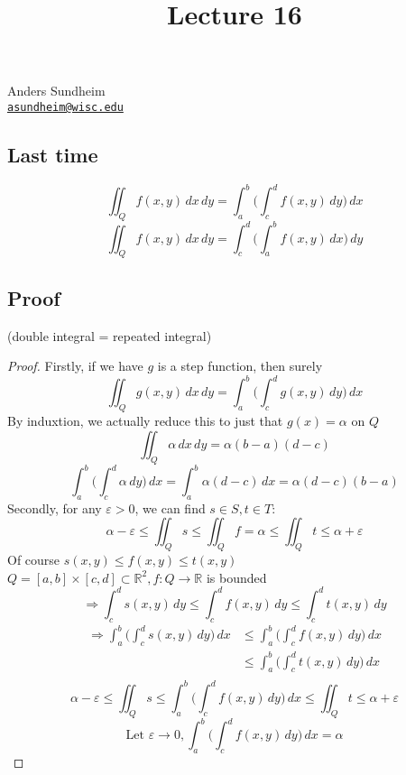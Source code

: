 \documentclass[12pt]{article}
\title{Lecture 16}
\newcommand{\BR}{\mathbb R}
\begin{document}
\maketitle
\vspace*{-0.25in}
\begin{center}
	Anders Sundheim \\
	\href{mailto:asundheim@wisc.edu}{{\tt asundheim@wisc.edu}}
\end{center}
\subsection*{Last time}
  \[ \iint_Qf(x,y)\,dx\,dy=\int_a^b\Big(\int_c^df(x,y)\,dy\Big)\,dx \]
  \[ \iint_Qf(x,y)\,dx\,dy=\int_c^d\Big(\int_a^bf(x,y)\,dx\Big)\,dy \]
\subsection*{Proof}
  (double integral = repeated integral) \\
  \begin{proof}
    Firstly, if we have $g$ is a step function, then surely
    \[ \iint_Qg(x,y)\,dx\,dy=\int_a^b\Big(\int_c^dg(x,y)\,dy\Big)\,dx \]
    By induxtion, we actually reduce this to just that $g(x)=\alpha$ on $Q$ \\
    \[ \iint_Q\alpha\,dx\,dy = \alpha(b-a)(d-c) \]
    \[ \int_a^b\Big(\int_c^d\alpha\,dy\Big)\,dx=\int_a^b\alpha(d-c)\,dx=\alpha(d-c)(b-a) \]
    Secondly, for any $\varepsilon>0$, we can find $s\in S,t\in T:$ \\
    \[ \alpha-\varepsilon\leq\iint_Qs\leq\iint_Qf=\alpha\leq\iint_Qt\leq\alpha+\varepsilon \]
    Of course $s(x,y)\leq f(x,y)\leq t(x,y)$ \\
    $Q=[a,b]\times[c,d]\subset\BR^2,f:Q\rightarrow\BR$ is bounded \\
    \[ \Rightarrow \int_c^ds(x,y)\,dy\leq\int_c^df(x,y)\,dy\leq\int_c^dt(x,y)\,dy \]
    \begin{align*}
      \Rightarrow \int_a^b\Big(\int_c^ds(x,y)\,dy\Big)\,dx & \leq\int_a^b\Big(\int_c^df(x,y)\,dy\Big)\,dx \\
      & \leq \int_a^b\Big(\int_c^dt(x,y)\,dy\Big)\,dx \\
    \end{align*}
    \[ \alpha-\varepsilon\leq\iint_Qs\leq\int_a^b\Big(\int_c^df(x,y)\,dy\Big)\,dx\leq\iint_Qt\leq\alpha+\varepsilon \]
    \[ \text{Let }\varepsilon\rightarrow 0,\int_a^b\Big(\int_c^df(x,y)\,dy\Big)\,dx=\alpha \]
  \end{proof}
\end{document}
